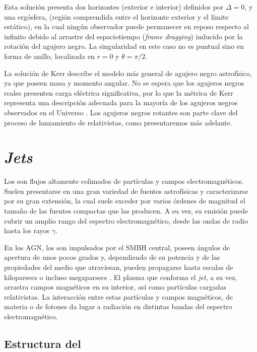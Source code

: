 	Esta solución presenta dos horizontes (exterior e interior) definidos por $\Delta=0$, y una {ergósfera}, (región comprendida entre el horizonte exterior y el {límite estático}), en la cual ningún observador puede permanecer en reposo respecto al infinito debido al arrastre del espaciotiempo (\textit{frame dragging}) inducido por la rotación del agujero negro.
	La singularidad en este caso no es puntual sino en forma de anillo, localizada en $r=0$ y $\theta=\pi/2$.

	La solución de Kerr describe el modelo más general de agujero negro astrofísico, ya que poseen masa y momento angular.
	No se espera que los agujeros negros reales presenten carga eléctrica significativa, por lo que la métrica de Kerr representa una descripción adecuada para la mayoría de los agujeros negros observados en el Universo \citep[e.g.,][]{Carroll2004,Meier2012}.
	Los agujeros negros rotantes son parte clave del proceso de lanzamiento de \jets relativistas, como presentaremos m\'as adelante.

\section{\textit{Jets}} \label{sec:Jets}

	Los \jets son flujos altamente colimados de partículas y campos electromagnéticos.
	Suelen presentarse en una gran variedad de fuentes astrofísicas y caracterizarse por su gran extensión, la cual suele exceder por varios órdenes de magnitud el tamaño de las fuentes compactas que las producen.
	A su vez, su emisión puede cubrir un amplio rango del espectro electromagnético, desde las ondas de radio hasta los rayos $\gamma$.

	En los AGN, los \jets son impulsados por el SMBH central, poseen ángulos de apertura de unos pocos grados y, dependiendo de su potencia y de las propiedades del medio que atraviesan, pueden propagarse hasta escalas de kiloparsecs o incluso megaparsecs \citep{Boccardi2017}.
	El plasma que conforma el \textit{jet}, a su vez, arrastra campos magnéticos en su interior, así como partículas cargadas relativistas.
	La interacción entre estas partículas y campos magnéticos, de materia o de fotones da lugar a radiación en distintas bandas del espectro electromagnético.


\subsection{Estructura del \jet}\label{ssec:estructura}%

